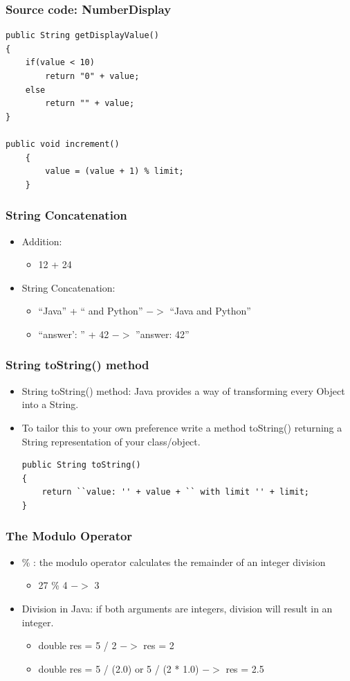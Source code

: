 \begin{frame}[fragile]
\frametitle{Source code: NumberDisplay}
\codelist
\begin{lstlisting}
public String getDisplayValue()‏
{
    if(value < 10)‏
        return "0" + value;
    else
        return "" + value;
}

public void increment()‏
    {
        value = (value + 1) % limit;
    }
\end{lstlisting}
\end{frame}

\begin{frame}
\frametitle{String Concatenation}
\begin{itemize}
\item Addition:
\begin{itemize}
\item 12 + 24
\end{itemize}
\item String Concatenation:
\begin{itemize}
\item ``Java'' + `` and Python'' $->$ ``Java and Python''
\item ``answer': '' + 42 $->$ ''answer: 42''
\end{itemize}
\end{itemize}
\end{frame}

\begin{frame}[fragile]
\frametitle{String toString() method}
\begin{itemize}
\item String toString() method: Java provides a way of transforming every Object into a String. 
\item To tailor this to your own preference write a method toString() returning a String representation of your class/object.
\codelist
\begin{lstlisting}
public String toString()‏
{
	return ``value: '' + value + `` with limit '' + limit;
}
\end{lstlisting}
\end{itemize}
\end{frame}

\begin{frame}
\frametitle{The Modulo Operator}
\begin{itemize}
\item \% : the modulo operator calculates the remainder of an integer division
\begin{itemize}
\item 27 \% 4 $->$ 3
\end{itemize}
\item Division in Java: if both arguments are integers, division will result in an integer.
\begin{itemize}
\item double res = 5 / 2 $->$ res = 2
\item double res = 5 / (2.0) or 5 / (2 * 1.0)    $->$ res = 2.5
\end{itemize}
\end{itemize}
\end{frame}

